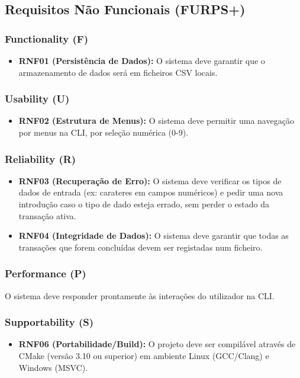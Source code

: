 \documentclass[a4paper]{llncs}
\begin{document}
\subsection{Requisitos Não Funcionais (FURPS+)}

\subsubsection{Functionality (F)}
\begin{itemize}
    \item \textbf{RNF01 (Persistência de Dados):} O sistema deve garantir que o armazenamento de dados será em ficheiros CSV locais.
\end{itemize}
\subsubsection{Usability (U)}
\begin{itemize}
    \item \textbf{RNF02 (Estrutura de Menus):} O sistema deve permitir uma navegação por menus na CLI, por seleção numérica (0-9).
\end{itemize}
\subsubsection{Reliability (R)}
\begin{itemize}
    \item \textbf{RNF03 (Recuperação de Erro):} O sistema deve verificar os tipos de dados de entrada (ex: carateres em campos numéricos) e pedir uma nova introdução caso o tipo de dado esteja errado, sem perder o estado da transação ativa.
    \item \textbf{RNF04 (Integridade de Dados):} O sistema deve garantir que todas as transações que forem concluídas devem ser registadas num ficheiro.
\end{itemize}
\subsubsection{Performance (P)}
O sistema deve responder prontamente às interações do utilizador na CLI.

\subsubsection{Supportability (S)}
\begin{itemize}
    \item \textbf{RNF06 (Portabilidade/Build):} O projeto deve ser compilável através de CMake (versão 3.10 ou superior) em ambiente Linux (GCC/Clang) e Windows (MSVC).
\end{itemize}
\end{document}
